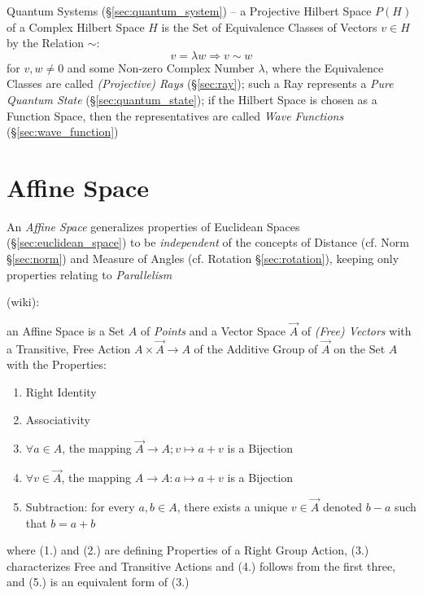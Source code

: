 \fist Quantum Systems (\S\ref{sec:quantum_system}) -- a
Projective Hilbert Space $P(H)$ of a Complex Hilbert Space $H$ is the Set of
Equivalence Classes of Vectors $v \in H$ by the Relation $\sim$:
\[
  v = \lambda w \Rightarrow v \sim w
\]
for $v,w \neq 0$ and some Non-zero Complex Number $\lambda$, where the
Equivalence Classes are called \emph{(Projective) Rays} (\S\ref{sec:ray}); such
a Ray represents a \emph{Pure Quantum State} (\S\ref{sec:quantum_state}); if the
Hilbert Space is chosen as a Function Space, then the representatives are called
\emph{Wave Functions} (\S\ref{sec:wave_function})



\section{Affine Space}\label{sec:affine_space}

An \emph{Affine Space} generalizes properties of Euclidean Spaces
(\S\ref{sec:euclidean_space}) to be \emph{independent} of the concepts of
Distance (cf. Norm \S\ref{sec:norm}) and Measure of Angles (cf. Rotation
\S\ref{sec:rotation}), keeping only properties relating to
\emph{Parallelism}

(wiki):

an Affine Space is a Set $A$ of \emph{Points} and a Vector Space $\vec{A}$ of
\emph{(Free) Vectors} with a Transitive, Free Action
$A \times \vec{A} \rightarrow A$ of the Additive Group of $\vec{A}$ on the
Set $A$ with the Properties:
\begin{enumerate}
\item Right Identity
\item Associativity
\item $\forall a \in A$, the mapping $\vec{A} \rightarrow A; v \mapsto a + v$ is
  a Bijection
\item $\forall v \in \vec{A}$, the mapping $A \rightarrow A : a \mapsto a + v$
  is a Bijection
\item Subtraction: for every $a, b \in A$, there exists a unique $v \in \vec{A}$
  denoted $b - a$ such that $b = a + b$
\end{enumerate}
where (1.) and (2.) are defining Properties of a Right Group Action, (3.)
characterizes Free and Transitive Actions and (4.) follows from the first three,
and (5.) is an equivalent form of (3.)

